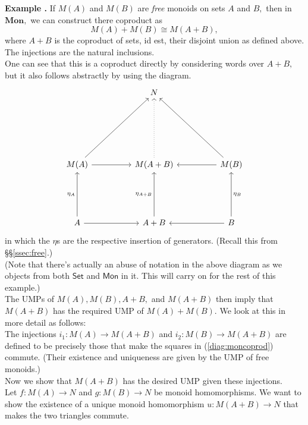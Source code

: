 \documentclass[11pt,leqno,landscape,semhelv]{seminar}
\theoremstyle{definition}
\numberwithin{joke}{section}
\numberwithin{thm}{section}
\numberwithin{equation}{section}
\newcommand{\example}[1]{\refstepcounter{thm}\par\medskip
   {\textbf{Example \thethm.} #1} \rmfamily}
\begin{document}
\example{} If $M(A)$ and $M(B)$ are \emph{free} monoids on sets $A$ and $B,$ then in $\mathbf{Mon},$ we can construct there coproduct as
\begin{equation*} 
  M(A) + M(B) \cong M(A+B),
\end{equation*}
where $A+B$ is the coproduct of sets, id est, their disjoint union as defined above.\\
The injections are the natural inclusions.\\
One can see that this is a coproduct directly by considering words over $A + B,$ but it also follows abstractly by using the diagram.
\begin{equation} \label{diag:moncoprod}
  \begin{tikzcd}
    && N&&\\&&&&\\&&&&\\&&&&\\
    M(A) \arrow[rruuuu] \arrow[rr]&  & 
    M(A+B) \arrow[uuuu, dotted]    &  & M(B) \arrow[lluuuu] \arrow[ll]
    \\&&&&\\&&&&\\
    A \arrow[uuu, "\eta_A"] \arrow[rr] &  & A+B \arrow[uuu, "\eta_{A+B}"] 
    && B \arrow[ll] \arrow[uuu, "\eta_B"']
  \end{tikzcd}
\end{equation}
in which the $\eta$s are the respective insertion of generators. (Recall this from \S\S\ref{ssec:free}.)\\
(Note that there's actually an abuse of notation in the above diagram as we objects from both $\mathsf{Set}$ and $\mathsf{Mon}$ in it. This will carry on for the rest of this example.)\\
The UMPs of $M(A), M(B), A+B,$ and $M(A+B)$ then imply that $M(A+B)$ has the required UMP of $M(A) + M(B).$ We look at this in more detail as follows:\\
The injections $i_1 : M(A) \to M(A + B)$ and $i_2 : M(B) \to M(A + B)$ are defined to be precisely those that make the squares in (\ref{diag:moncoprod}) commute. (Their existence and uniqueness are given by the UMP of free monoids.)\\
Now we show that $M(A + B)$ has the desired UMP given these injections.\\
Let $f:M(A) \to N$ and $g:M(B) \to N$ be monoid homomorphisms. We want to show the existence of a unique monoid homomorphism $u:M(A + B) \to N$ that makes the two triangles commute.\\
\end{document}
